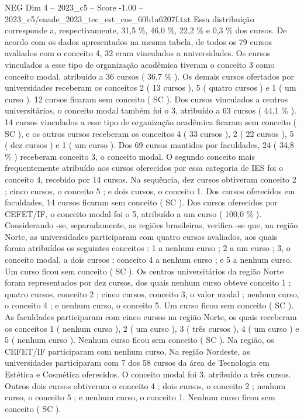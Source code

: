 \begin{textsample}{NEG Dim 4 – 2023\_c5 – Score -1.00 – 2023\_c5/enade\_2023\_tec\_est\_cos\_60b1a6207f.txt}
Essa distribuição corresponde a, respectivamente, 31,5 \%, 46,0 \%, 22,2 \% e 0,3 \% dos cursos.
De acordo com os dados apresentados na mesma tabela, de todos os 79 cursos avaliados com o conceito 4, 32 eram vinculados a universidades.
Os cursos vinculados a esse tipo de organização acadêmica tiveram o conceito 3 como conceito modal, atribuído a 36 cursos ( 36,7 \% ).
Os demais cursos ofertados por universidades receberam os conceitos 2 ( 13 cursos ), 5 ( quatro cursos ) e 1 ( um curso ). 12 cursos ficaram sem conceito ( SC ).
Dos cursos vinculados a centros universitários, o conceito modal também foi o 3, atribuído a 63 cursos ( 44,1 \% ). 14 cursos vinculados a esse tipo de organização acadêmica ficaram sem conceito ( SC ), e os outros cursos receberam os conceitos 4 ( 33 cursos ), 2 ( 22 cursos ), 5 ( dez cursos ) e 1 ( um curso ).
Dos 69 cursos mantidos por faculdades, 24 ( 34,8 \% ) receberam conceito 3, o conceito modal.
O segundo conceito mais frequentemente atribuído aos cursos oferecidos por essa categoria de IES foi o conceito 4, recebido por 14 cursos.
Na sequência, dez cursos obtiveram conceito 2 ; cinco cursos, o conceito 5 ; e dois cursos, o conceito 1.
Dos cursos oferecidos em faculdades, 14 cursos ficaram sem conceito ( SC ).
Dos cursos oferecidos por CEFET/IF, o conceito modal foi o 5, atribuído a um curso ( 100,0 \% ).
Considerando -se, separadamente, as regiões brasileiras, verifica -se que, na região Norte, as universidades participaram com quatro cursos avaliados, aos quais foram atribuídos os seguintes conceitos : 1 a nenhum curso ; 2 a um curso ; 3, o conceito modal, a dois cursos ; conceito 4 a nenhum curso ; e 5 a nenhum curso.
Um curso ficou sem conceito ( SC ).
Os centros universitários da região Norte foram representados por dez cursos, dos quais nenhum curso obteve conceito 1 ; quatro cursos, conceito 2 ; cinco cursos, conceito 3, o valor modal ; nenhum curso, o conceito 4 ; e nenhum curso, o conceito 5.
Um curso ficou sem conceito ( SC ).
As faculdades participaram com cinco cursos na região Norte, os quais receberam os conceitos 1 ( nenhum curso ), 2 ( um curso ), 3 ( três cursos ), 4 ( um curso ) e 5 ( nenhum curso ).
Nenhum curso ficou sem conceito ( SC ).
Na região, os CEFET/IF participaram com nenhum curso, Na região Nordeste, as universidades participaram com 7 dos 58 cursos da área de Tecnologia em Estética e Cosmética oferecidos.
O conceito modal foi 3, atribuído a três cursos.
Outros dois cursos obtiveram o conceito 4 ; dois cursos, o conceito 2 ; nenhum curso, o conceito 5 ; e nenhum curso, o conceito 1.
Nenhum curso ficou sem conceito ( SC ).

\end{textsample}
